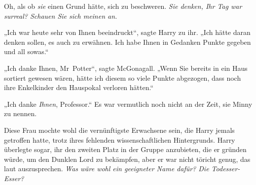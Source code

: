 Oh, als ob \emph{sie} einen Grund hätte, sich zu beschweren. \emph{Sie denken, Ihr Tag war surreal? Schauen Sie sich meinen an.}

„Ich war heute sehr von Ihnen beeindruckt“, sagte Harry zu ihr. „Ich hätte daran denken sollen, es auch zu erwähnen. Ich habe Ihnen in Gedanken Punkte gegeben und all sowas.“

„Ich danke Ihnen, Mr~Potter“, sagte McGonagall. „Wenn Sie bereits in ein Haus sortiert gewesen wären, hätte ich diesem so viele Punkte abgezogen, dass noch ihre Enkelkinder den Hauspokal verloren hätten.“

„Ich danke \emph{Ihnen}, Professor.“ Es war vermutlich noch nicht an der Zeit, sie Minny zu nennen.

Diese Frau mochte wohl die vernünftigste Erwachsene sein, die Harry jemals getroffen hatte, trotz ihres fehlenden wissenschaftlichen Hintergrunds. Harry überlegte sogar, ihr den zweiten Platz in der Gruppe anzubieten, die er gründen würde, um den Dunklen Lord zu bekämpfen, aber er war nicht töricht genug, das laut auszusprechen. \emph{Was wäre wohl ein geeigneter Name dafür? Die Todesser-Esser?}

